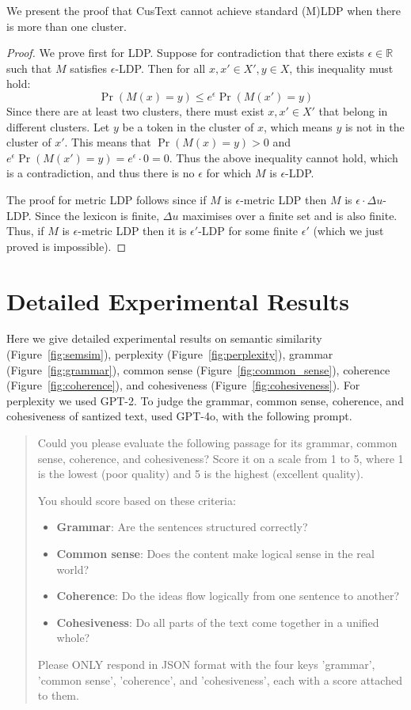 We present the proof that CusText cannot achieve standard (M)LDP when there is more than one cluster.
\begin{proof}
    We prove first for LDP.  Suppose for contradiction that there exists $\epsilon\in \mathbb{R}$ such that $M$ satisfies $\epsilon$-LDP. Then for all $x, x' \in X', y \in X$, this inequality must hold: 
    $$
        \Pr(M(x) = y) \leq e^\epsilon \Pr(M(x') = y)
    $$
    Since there are at least two clusters, there must exist $x, x' \in X'$ that belong in different clusters. Let $y$ be a token in the cluster of $x$, which means $y$ is not in the cluster of $x'$. This means that $\Pr(M(x) = y) > 0$ and $e^\epsilon \Pr(M(x') = y) = e^\epsilon \cdot 0 = 0$. Thus the above inequality cannot hold, which is a contradiction, and thus there is no  $\epsilon$ for which $M$ is $\epsilon$-LDP.

     The proof for metric LDP follows since if $M$ is $\epsilon$-metric LDP then  $M$ is $\epsilon\cdot \Delta u$-LDP. Since the lexicon is finite, $\Delta u$ maximises over a finite set and is also finite. Thus, if $M$ is $\epsilon$-metric LDP then it is $\epsilon'$-LDP for some finite $\epsilon'$ (which we just proved is impossible).    
\end{proof}


\section{Detailed Experimental Results}

Here we give detailed experimental results on 
semantic similarity (Figure~\ref{fig:semsim}),
perplexity (Figure~\ref{fig:perplexity}),
grammar (Figure~\ref{fig:grammar}),
common sense (Figure~\ref{fig:common_sense}), 
coherence (Figure~\ref{fig:coherence}), and 
cohesiveness (Figure~\ref{fig:cohesiveness}).
For perplexity we used GPT-2. To judge the grammar, common sense, coherence, and cohesiveness of santized text, used GPT-4o, with the following prompt. 


{\em
\begin{quote}
Could you please evaluate the following passage for its grammar, common sense, coherence, and cohesiveness? Score it on a scale from 1 to 5, where 1 is the lowest (poor quality) and 5 is the highest (excellent quality).

You should score based on these criteria:
\begin{itemize}
    \item \textbf{Grammar}: Are the sentences structured correctly?
    \item \textbf{Common sense}: Does the content make logical sense in the real world?
    \item \textbf{Coherence}: Do the ideas flow logically from one sentence to another?
    \item \textbf{Cohesiveness}: Do all parts of the text come together in a unified whole?
\end{itemize}

Please ONLY respond in JSON format with the four keys 'grammar', 'common sense', 'coherence', and 'cohesiveness', each with a score attached to them.
\end{quote}
}

